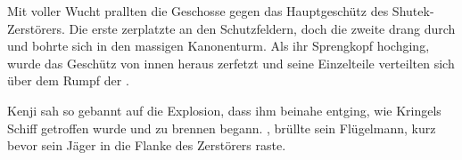 \par

Mit voller Wucht prallten die Geschosse gegen das Hauptgeschütz des Shutek-Zerstörers. Die erste zerplatzte an den Schutzfeldern, doch die zweite drang durch und bohrte sich in den massigen Kanonenturm. Als ihr Sprengkopf hochging, wurde das Geschütz von innen heraus zerfetzt und seine Einzelteile verteilten sich über dem Rumpf der .

\par

Kenji sah so gebannt auf die Explosion, dass ihm beinahe entging, wie Kringels Schiff getroffen wurde und zu brennen begann. , brüllte sein Flügelmann, kurz bevor sein Jäger in die Flanke des Zerstörers raste.
